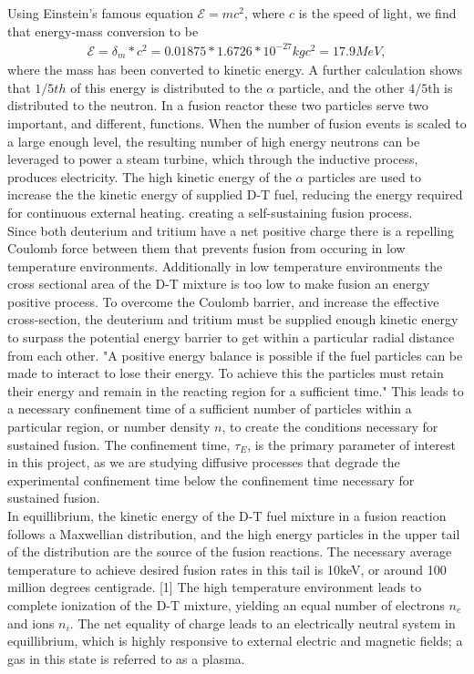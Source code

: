 \documentclass{article}
\begin{document}
Using Einstein's famous equation $\mathcal{E} = mc^2$, where $c$ is the speed of light, we find that energy-mass conversion to be
\begin{align*}
\mathcal{E} = \delta_m *c^2 = 0.01875*1.6726*10^{-27}kg c^2 = 17.9 MeV,
\end{align*}
where the mass has been converted to kinetic energy.
A further calculation shows that $1/5th$ of this energy is distributed to the $\alpha$ particle, and the other $4/5$th is distributed to the neutron. In a fusion reactor these two particles serve two important, and different, functions. When the number of fusion events is scaled to a large enough level, the resulting number of high energy neutrons can be leveraged to power a steam turbine, which through the inductive process, produces electricity. The high kinetic energy of the $\alpha$ particles are used to increase the the kinetic energy of supplied D-T fuel, reducing the energy required for continuous external heating. creating a self-sustaining fusion process. \\
Since both deuterium and tritium have a net positive charge there is a repelling Coulomb force between them that prevents fusion from occuring in low temperature environments. Additionally in low temperature environments the cross sectional area of the D-T mixture is too low to make fusion an energy positive process. To overcome the Coulomb barrier, and increase the effective cross-section, the deuterium and tritium must be supplied enough kinetic energy to surpass the potential energy barrier to get within a particular radial distance from each other. "A positive energy balance is possible if the fuel particles can be made to interact to lose their energy. To achieve this the particles must retain their energy and remain in the reacting region for a sufficient time." This leads to a necessary confinement time of a sufficient number of particles within a particular region, or number density $n$, to create the conditions necessary for sustained fusion. The confinement time, $\tau_E$, is the primary parameter of interest in this project, as we are studying diffusive processes that degrade the experimental confinement time below the confinement time necessary for sustained fusion.\\
 In equillibrium, the kinetic energy of the D-T fuel mixture in a fusion reaction follows a Maxwellian distribution, and the high energy particles in the upper tail of the distribution are the source of the fusion reactions. The necessary average temperature to achieve desired fusion rates in this tail is 10keV, or around 100 million degrees centigrade. [1] The high temperature environment leads to complete ionization of the D-T mixture, yielding an equal number of electrons $n_e$ and ions $n_i$. The net equality of charge leads to an electrically neutral system in equillibrium, which is highly responsive to external electric and magnetic fields; a gas in this state is referred to as a plasma.\\
\end{document}
